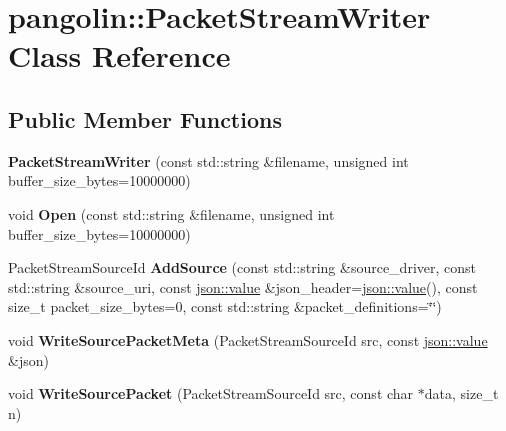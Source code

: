 \hypertarget{classpangolin_1_1_packet_stream_writer}{}\section{pangolin\+:\+:Packet\+Stream\+Writer Class Reference}
\label{classpangolin_1_1_packet_stream_writer}
\subsection*{Public Member Functions}
\begin{DoxyCompactItemize}
\item 
{\bfseries Packet\+Stream\+Writer} (const std\+::string \&filename, unsigned int buffer\+\_\+size\+\_\+bytes=10000000)\hypertarget{classpangolin_1_1_packet_stream_writer_aa157486194193ca4a8f68fb203637800}{}\label{classpangolin_1_1_packet_stream_writer_aa157486194193ca4a8f68fb203637800}

\item 
void {\bfseries Open} (const std\+::string \&filename, unsigned int buffer\+\_\+size\+\_\+bytes=10000000)\hypertarget{classpangolin_1_1_packet_stream_writer_aa514d5604ac0f347f7275c434f37bdca}{}\label{classpangolin_1_1_packet_stream_writer_aa514d5604ac0f347f7275c434f37bdca}

\item 
Packet\+Stream\+Source\+Id {\bfseries Add\+Source} (const std\+::string \&source\+\_\+driver, const std\+::string \&source\+\_\+uri, const \hyperlink{classpangolin_1_1json_1_1value}{json\+::value} \&json\+\_\+header=\hyperlink{classpangolin_1_1json_1_1value}{json\+::value}(), const size\+\_\+t packet\+\_\+size\+\_\+bytes=0, const std\+::string \&packet\+\_\+definitions=\char`\"{}\char`\"{})\hypertarget{classpangolin_1_1_packet_stream_writer_aff95a47df0697479f63a98d8021bb2c1}{}\label{classpangolin_1_1_packet_stream_writer_aff95a47df0697479f63a98d8021bb2c1}

\item 
void {\bfseries Write\+Source\+Packet\+Meta} (Packet\+Stream\+Source\+Id src, const \hyperlink{classpangolin_1_1json_1_1value}{json\+::value} \&json)\hypertarget{classpangolin_1_1_packet_stream_writer_ae0b8269bdc55d16722e27fcc2ab687b6}{}\label{classpangolin_1_1_packet_stream_writer_ae0b8269bdc55d16722e27fcc2ab687b6}

\item 
void {\bfseries Write\+Source\+Packet} (Packet\+Stream\+Source\+Id src, const char $\ast$data, size\+\_\+t n)\hypertarget{classpangolin_1_1_packet_stream_writer_a04471a882b3cf388fb15b96536972997}{}\label{classpangolin_1_1_packet_stream_writer_a04471a882b3cf388fb15b96536972997}


\end{DoxyCompactItemize}
